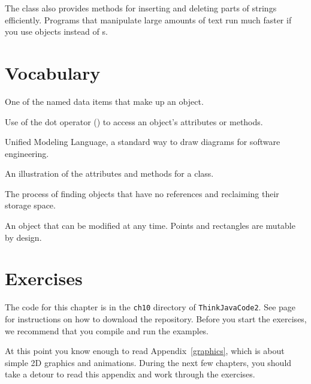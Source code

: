 The  class also provides methods for inserting and deleting parts of strings efficiently.
Programs that manipulate large amounts of text run much faster if you use  objects instead of s.


\section{Vocabulary}

\begin{description}

One of the named data items that make up an object.

Use of the dot operator () to access an object's attributes or methods.

Unified Modeling Language, a standard way to draw diagrams for software engineering.

An illustration of the attributes and methods for a class.


The process of finding objects that have no references and reclaiming their storage space.

An object that can be modified at any time.
Points and rectangles are mutable by design.

\end{description}


\section{Exercises}

The code for this chapter is in the {\tt ch10} directory of {\tt ThinkJavaCode2}.
See page~\pageref{code} for instructions on how to download the repository.
Before you start the exercises, we recommend that you compile and run the examples.

At this point you know enough to read Appendix~\ref{graphics}, which is about simple 2D graphics and animations.
During the next few chapters, you should take a detour to read this appendix and work through the exercises.


